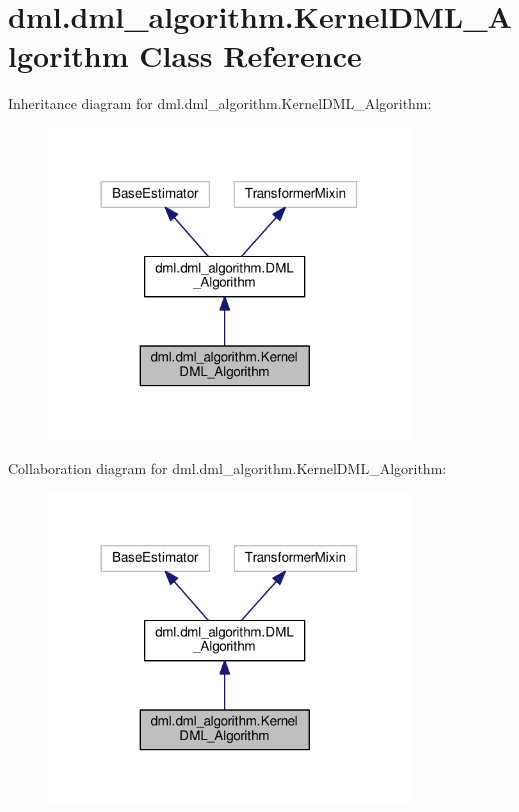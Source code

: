 \hypertarget{classdml_1_1dml__algorithm_1_1KernelDML__Algorithm}{}\section{dml.\+dml\+\_\+algorithm.\+Kernel\+D\+M\+L\+\_\+\+Algorithm Class Reference}
\label{classdml_1_1dml__algorithm_1_1KernelDML__Algorithm}


Inheritance diagram for dml.\+dml\+\_\+algorithm.\+Kernel\+D\+M\+L\+\_\+\+Algorithm\+:\nopagebreak
\begin{figure}[H]
\begin{center}
\leavevmode
\includegraphics[width=272pt]{classdml_1_1dml__algorithm_1_1KernelDML__Algorithm__inherit__graph}
\end{center}
\end{figure}


Collaboration diagram for dml.\+dml\+\_\+algorithm.\+Kernel\+D\+M\+L\+\_\+\+Algorithm\+:\nopagebreak
\begin{figure}[H]
\begin{center}
\leavevmode
\includegraphics[width=272pt]{classdml_1_1dml__algorithm_1_1KernelDML__Algorithm__coll__graph}
\end{center}
\end{figure}
